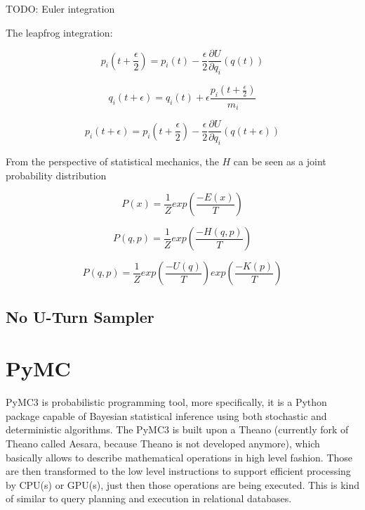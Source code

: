 \documentclass[
  digital, %
  oneside, %
  lof,     %
  lot,     %
]{fithesis4}
\begin{document}
TODO: Euler integration

The leapfrog integration:

\begin{equation}
  p_i \left(t + \frac{\epsilon}{2} \right) = p_i(t) - \frac{\epsilon}{2} \frac{\partial U}{\partial q_i} (q(t))
\end{equation}

\begin{equation}
  q_i(t + \epsilon) = q_i(t) + \epsilon \frac{p_i \left(t + \frac{\epsilon}{2} \right)}{m_i}
\end{equation}

\begin{equation}
  p_i(t + \epsilon) = p_i \left( t + \frac{\epsilon}{2} \right) - \frac{\epsilon}{2} \frac{\partial U}{\partial q_i} \left( q \left( t + \epsilon \right) \right)
\end{equation}

From the perspective of statistical mechanics, the $H$ can be seen
as a joint probability distribution

\begin{equation}
  P(x) = \frac{1}{Z} exp \left( \frac{-E(x)}{T} \right)
\end{equation}

\begin{equation}
  P(q, p) = \frac{1}{Z} exp \left( \frac{-H(q, p)}{T} \right)
\end{equation}

\begin{equation}
  P(q, p) = \frac{1}{Z} exp \left( \frac{-U(q)}{T} \right) exp \left( \frac{-K(p)}{T} \right)
\end{equation}

\subsection{No U-Turn Sampler}

\section{PyMC}

PyMC3 is probabilistic programming tool, more specifically, 
it is a Python package capable of Bayesian statistical 
inference using both stochastic and deterministic algorithms. 
The PyMC3 is built upon a Theano (currently fork of 
Theano called Aesara, because Theano is not developed anymore), 
which basically allows to describe mathematical operations in 
high level fashion. 
Those are then transformed to the low level instructions to 
support efficient processing by CPU(s) or GPU(s), just then 
those operations are being executed. 
This is kind of similar to query planning and execution in 
relational databases.
\end{document}
